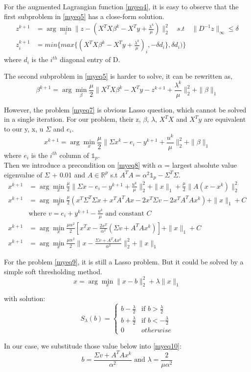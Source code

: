 \documentclass[a4paper,11pt]{article}
\begin{document}
	For the augmented Lagrangian function \eqref{myeq4}, it is easy to observe that the first subproblem in \eqref{myeq5} has a close-form solution.
	\begin{align*}
	z^{k+1} &= \arg\!\min_z \|z - (X^TX\beta^{k}-X^Ty+\frac{\lambda^k}{\mu})\|_{2}^2 \quad s.t \quad \|D^{-1}z\|_\infty \leq \delta\\
	z^{k+1}_i &= min\{max\{(X^TX\beta^{k}-X^Ty+\frac{\lambda^k}{\mu})_i,-\delta{d}_i\}, \delta{d}_i)\}
	\tag{6}\label{myeq6}
	\end{align*}
	where $d_i$ is the $i^{th}$ diagonal entry of D.
	
	The second subproblem in \eqref{myeq5} is harder to solve, it can be rewritten as, 
	\[
	\beta^{k+1} = \arg\!\min_\beta \frac{\mu}{2}\|X^TX\beta^{k}-X^Ty-z^{k+1}+\frac{\lambda^k}{\mu}\|_{2}^2 + \|\beta\|_1
	\tag{7}\label{myeq7}
	\]
	
	However, the problem \eqref{myeq7} is obvious Lasso question, which cannot be solved in a single iteration. For our problem, their z, $\beta$, $\lambda$,  $X^TX$ and $X^Ty$ are equivalent to our y, x, u $\Sigma$ and $e_i$.
	\[
	x^{k+1} = \arg\!\min_x \frac{\mu}{2}\|\Sigma{x}^{k}-e_i-y^{k+1}+\frac{u^k}{\mu}\|_{2}^2 + \|\beta\|_1
	\tag{8}\label{myeq8}
	\]
	where $e_i$ is the $i^{th}$ column of $\mathds{1}_p $.\\
	
	Then we introduce a precondition on \eqref{myeq8} with $\alpha$ =  largest absolute value eigenvalue of $\Sigma$ + 0.01 and $A \in \mathbb{R}^p$ s.t $A^TA = \alpha^2\mathds{1}_p - \Sigma^T\Sigma$.
	\begin{align*}
	x^{k+1} &= \arg\!\min_x \frac{\mu}{2}\|\Sigma{x}-e_i-y^{k+1}+\frac{u^k}{\mu}\|_{2}^2 + \|x\|_1 +\frac{\mu}{2}\|A(x-x^k)\|_{2}^2\\
	x^{k+1} &= \arg\!\min_x \frac{\mu}{2}(x^T\Sigma^T\Sigma{x} + x^TA^TA{x}-2x^T\Sigma{v} - 2x^TA^TA{x^k})+ \|x\|_1 + C\\
	&\text{where } v = e_i+y^{k+1}-\frac{u^k}{\mu} \text{ and constant } C\\
	x^{k+1} &= \arg\!\min_x \frac{\mu\alpha^2}{2}[x^Tx-\frac{2x^T}{\alpha^2}(\Sigma{v}+A^TA{x^k})]+ \|x\|_1+C\\
	x^{k+1} &= \arg\!\min_x \frac{\mu\alpha^2}{2}\|x-\frac{\Sigma{v}+A^TA{x^k}}{\alpha^2}\|_{2}^2+ \|x\|_1
	\tag{9}\label{myeq9}
	\end{align*}
	
	For the problem \eqref{myeq9}, it is still a Lasso problem. But it could be solved by a simple soft thresholding method. 
	\[
	x = \arg\!\min_x \|x-b\|_{2}^2 +\lambda\|x\|_1
	\]
	
	with solution:
	\[
	S_\lambda(b)=
	\begin{cases}
	b - \frac{\lambda}{2} & \text{if } b > \frac{\lambda}{2}\\
	b + \frac{\lambda}{2} & \text{if } b < -\frac{\lambda}{2}\\
	0 & otherwise
	\end{cases}
	\tag{10}\label{myeq10}
	\]
	
	In our case, we substitude those value below into \eqref{myeq10}:
	$$b = \frac{\Sigma{v}+A^TA{x^k}}{\alpha^2} \text{ and } \lambda = \frac{2}{\mu\alpha^2}$$ 
\end{document}
